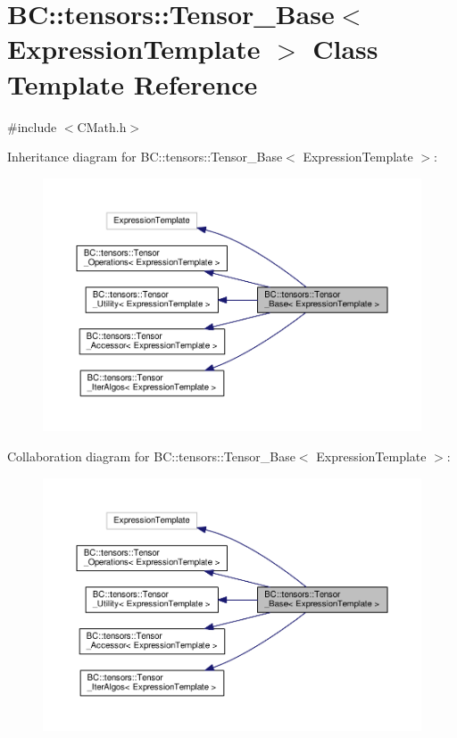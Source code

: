 \hypertarget{classBC_1_1tensors_1_1Tensor__Base}{}\section{BC\+:\+:tensors\+:\+:Tensor\+\_\+\+Base$<$ Expression\+Template $>$ Class Template Reference}
\label{classBC_1_1tensors_1_1Tensor__Base}


{\ttfamily \#include $<$C\+Math.\+h$>$}



Inheritance diagram for BC\+:\+:tensors\+:\+:Tensor\+\_\+\+Base$<$ Expression\+Template $>$\+:
\nopagebreak
\begin{figure}[H]
\begin{center}
\leavevmode
\includegraphics[width=350pt]{classBC_1_1tensors_1_1Tensor__Base__inherit__graph}
\end{center}
\end{figure}


Collaboration diagram for BC\+:\+:tensors\+:\+:Tensor\+\_\+\+Base$<$ Expression\+Template $>$\+:
\nopagebreak
\begin{figure}[H]
\begin{center}
\leavevmode
\includegraphics[width=350pt]{classBC_1_1tensors_1_1Tensor__Base__coll__graph}
\end{center}
\end{figure}
